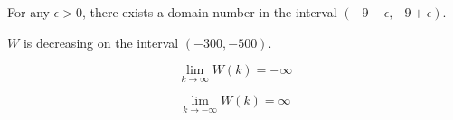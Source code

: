 \documentclass{ximera}
\begin{document}
\begin{exercise}
\begin{question} 

For any $\epsilon > 0$, there exists a domain number in the interval $(-9-\epsilon, -9+\epsilon)$.
\begin{multipleChoice}
\end{multipleChoice}


\end{question}









\begin{question} 

$W$ is decreasing on the interval $(-300, -500)$.
\begin{multipleChoice}
\end{multipleChoice}


\end{question}







\begin{question} 

\[
\lim\limits_{k \to \infty} W(k) = -\infty
\]
\begin{multipleChoice}
\end{multipleChoice}


\end{question}








\begin{question} 

\[
\lim\limits_{k \to -\infty} W(k) = \infty
\]
\begin{multipleChoice}
\end{multipleChoice}


\end{question}







\end{exercise}
\end{document}
